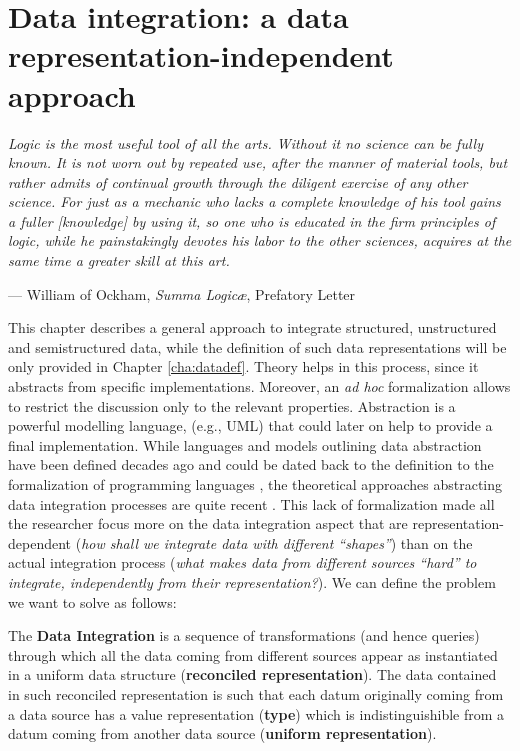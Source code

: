 \chapter{Data integration: a data representation-independent approach}\label{cha:dataintegration}

\epigraph{\textit{
		Logic is the most useful tool of all the arts. Without it no science can be fully known. It is not worn out by repeated use, after the manner of material tools, but rather admits of continual growth through the diligent exercise of any other science. For just as a mechanic who lacks a complete knowledge of his tool gains a fuller [knowledge] by using it, so one who is educated in the firm principles of logic, while he painstakingly devotes his labor to the other sciences, acquires at the same time a greater skill at this art.
	}}{--- William of Ockham, \textit{Summa Logic\ae}, Prefatory Letter}

This chapter describes a general approach to integrate structured, unstructured and semistructured data, while the definition of such data representations will be only provided in Chapter \vref{cha:datadef}. Theory helps in this process, since it abstracts from specific implementations. Moreover, an \textit{ad hoc} formalization allows to restrict the discussion only to the relevant properties. Abstraction is a powerful modelling language, (e.g., UML) that could later on help  to provide a final implementation. While languages and models outlining data abstraction have been defined decades ago and could be dated back to the definition to the formalization of programming languages \cite{omg96,TPLPierce}, the theoretical approaches abstracting data integration processes are quite recent \cite{Lenzerini02,DeGiacomo2018}. This lack of formalization made all the researcher focus more on the data integration aspect that are representation-dependent (\textit{how shall we integrate data with different ``shapes''}) than on the actual integration process (\textit{what makes data from different sources ``hard'' to integrate, independently from their representation?}). We can define the problem we want to solve as follows:

\begin{definition}
	
  The \textbf{Data Integration} is a sequence of transformations (and hence queries) through which all the data coming from different sources appear as instantiated in a uniform data structure (\textbf{reconciled representation}). The data contained in such reconciled representation is such that each datum originally coming from a data source has a value representation (\textbf{type})  which is indistinguishible from a datum coming from another data source (\textbf{uniform representation}).
\end{definition}

